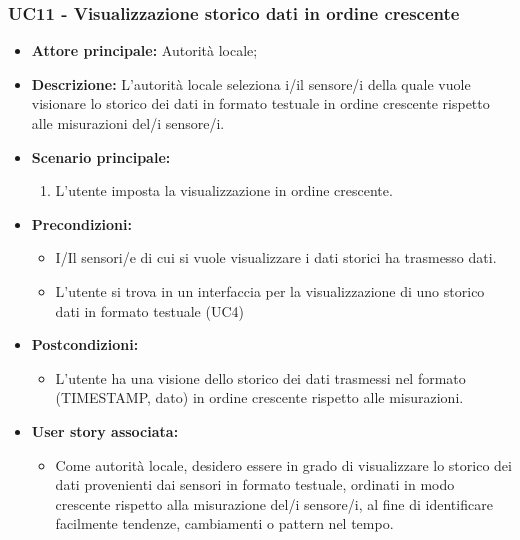 \subsubsection{UC11 - Visualizzazione storico dati in ordine crescente}
\begin{itemize}
    \item \textbf{Attore principale:} Autorità locale;
    \item \textbf{Descrizione:} L’autorità locale seleziona i/il sensore/i della quale vuole visionare lo storico dei dati in formato testuale in ordine crescente rispetto alle misurazioni del/i sensore/i.
    \item \textbf{Scenario principale:}
          \begin{enumerate}
              \item L'utente imposta la visualizzazione in ordine crescente.
          \end{enumerate}
    \item \textbf{Precondizioni:}
          \begin{itemize}
              \item  I/Il sensori/e di cui si vuole visualizzare i dati storici ha trasmesso dati.
              \item  L'utente si trova in un interfaccia per la visualizzazione di uno storico dati in formato testuale (UC4)
          \end{itemize}
    \item \textbf{Postcondizioni:}
          \begin{itemize}
              \item  L'utente ha una visione dello storico dei dati trasmessi nel formato (TIMESTAMP, dato) in ordine crescente rispetto alle misurazioni.
          \end{itemize}
    \item \textbf{User story associata:}
          \begin{itemize}
              \item Come autorità locale, desidero essere in grado di visualizzare lo storico dei dati provenienti dai sensori in formato testuale, ordinati in modo crescente rispetto alla misurazione del/i sensore/i, al fine di identificare facilmente tendenze, cambiamenti o pattern nel tempo.
          \end{itemize}
\end{itemize}